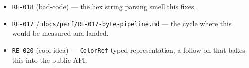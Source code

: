 \begin{itemize}
\tightlist
\item
  \texttt{R\allowbreak{}E\allowbreak{}-\allowbreak{}0\allowbreak{}1\allowbreak{}8} (bad-code) --- the hex string parsing smell this fixes.
\item
  \texttt{R\allowbreak{}E\allowbreak{}-\allowbreak{}0\allowbreak{}1\allowbreak{}7} / \texttt{d\allowbreak{}o\allowbreak{}c\allowbreak{}s\allowbreak{}/\allowbreak{}p\allowbreak{}e\allowbreak{}r\allowbreak{}f\allowbreak{}/\allowbreak{}R\allowbreak{}E\allowbreak{}-\allowbreak{}0\allowbreak{}1\allowbreak{}7\allowbreak{}-\allowbreak{}b\allowbreak{}y\allowbreak{}t\allowbreak{}e\allowbreak{}-\allowbreak{}p\allowbreak{}i\allowbreak{}p\allowbreak{}e\allowbreak{}l\allowbreak{}i\allowbreak{}n\allowbreak{}e\allowbreak{}.\allowbreak{}m\allowbreak{}d} --- the cycle where this would be measured and landed.
\item
  \texttt{R\allowbreak{}E\allowbreak{}-\allowbreak{}0\allowbreak{}2\allowbreak{}0} (cool idea) --- \texttt{C\allowbreak{}o\allowbreak{}l\allowbreak{}o\allowbreak{}r\allowbreak{}R\allowbreak{}e\allowbreak{}f} typed representation, a follow-on that bakes this into the public API.
\end{itemize}

